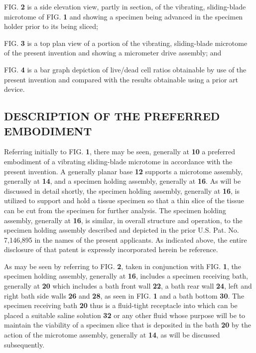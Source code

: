 \documentclass{article}
\begin{document}
FIG. \textbf{2} is a side elevation view, partly in section, of the vibrating, sliding-blade microtome of FIG. \textbf{1} and showing a specimen being advanced in the specimen holder prior to its being sliced;

FIG. \textbf{3} is a top plan view of a portion of the vibrating, sliding-blade microtome of the present invention and showing a micrometer drive assembly; and

FIG. \textbf{4} is a bar graph depiction of live/dead cell ratios obtainable by use of the present invention and compared with the results obtainable using a prior art device.

\subsection*{DESCRIPTION OF THE PREFERRED EMBODIMENT}

Referring initially to FIG. \textbf{1}, there may be seen, generally at \textbf{10} a preferred embodiment of a vibrating sliding-blade microtome in accordance with the present invention. A generally planar base \textbf{12} supports a microtome assembly, generally at \textbf{14}, and a specimen holding assembly, generally at \textbf{16}. As will be discussed in detail shortly, the specimen holding assembly, generally at \textbf{16}, is utilized to support and hold a tissue specimen so that a thin slice of the tissue can be cut from the specimen for further analysis. The specimen holding assembly, generally at \textbf{16}, is similar, in overall structure and operation, to the specimen holding assembly described and depicted in the prior U.S. Pat. No. 7,146,895 in the names of the present applicants. As indicated above, the entire disclosure of that patent is expressly incorporated herein be reference.

As may be seen by referring to FIG. \textbf{2}, taken in conjunction with FIG. \textbf{1}, the specimen holding assembly, generally at \textbf{16}, includes a specimen receiving bath, generally at \textbf{20} which includes a bath front wall \textbf{22}, a bath rear wall \textbf{24}, left and right bath side walls \textbf{26} and \textbf{28}, as seen in FIG. \textbf{1} and a bath bottom \textbf{30}. The specimen receiving bath \textbf{20} thus is a fluid-tight receptacle into which can be placed a suitable saline solution \textbf{32} or any other fluid whose purpose will be to maintain the viability of a specimen slice that is deposited in the bath \textbf{20} by the action of the microtome assembly, generally at \textbf{14}, as will be discussed subsequently.
\end{document}
